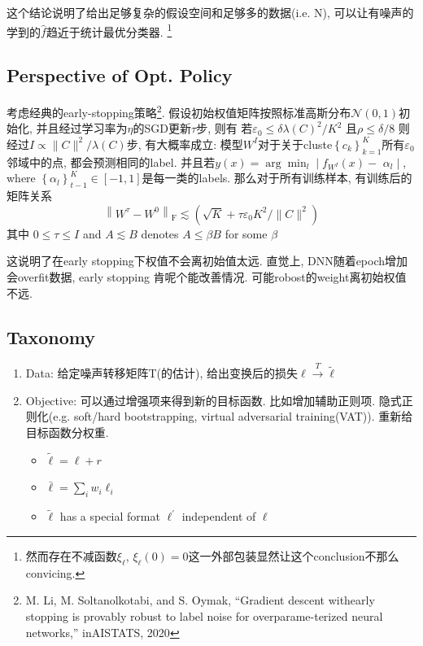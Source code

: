 \documentclass{article}
\begin{document}
\begin{remark}
    这个结论说明了给出足够复杂的假设空间和足够多的数据(i.e. N), 可以让有噪声的学到的$\hat f$趋近于统计最优分类器. \footnote{
        然而存在不减函数$\xi_{\ell}$, $\xi_{\ell}(0)=0$这一外部包装显然让这个conclusion不那么convicing.
    }
\end{remark}

\subsection{Perspective of Opt. Policy}

考虑经典的early-stopping策略\footnote{
    M. Li, M. Soltanolkotabi, and S. Oymak, “Gradient descent withearly stopping is provably robust to label noise for overparame-terized neural networks,” inAISTATS, 2020
}. 
假设初始权值矩阵按照标准高斯分布$\mathcal N(0, 1)$初始化, 并且经过学习率为$\eta$的SGD更新$\tau$步, 则有
若$\varepsilon_{0} \leq \delta \lambda(C)^{2} / K^{2}$
且$\rho \leq \delta / 8$
则经过$I \propto\|C\|^{2} / \lambda(C)$步,
有大概率成立:
模型$W^{I}$对于关于cluste$\left\{c_{k}\right\}_{k=1}^{K}$所有$\varepsilon_0$邻域中的点, 都会预测相同的label.
并且若$y(x)=\arg \min _{l} \mid f_{W^{I}}(x)-$
$\alpha_{l} \mid$, 
where $\left\{\alpha_{l}\right\}_{t-1}^{K} \in[-1,1]$是每一类的labels.
那么对于所有训练样本, 有训练后的矩阵关系
\begin{equation}
    \left\|W^{\tau}-W^{0}\right\|_{\mathrm{F}} \lesssim\left(\sqrt{K}+\tau \varepsilon_{0} K^{2} /\|C\|^{2}\right)
\end{equation}
其中
$0 \leq \tau \leq I$ and $A \lesssim B$ denotes $A \leq \beta B$ for some $\beta$

\begin{remark}
    这说明了在early stopping下权值不会离初始值太远. 直觉上, DNN随着epoch增加会overfit数据, early stopping 肯呢个能改善情况. 可能robost的weight离初始权值不远.
\end{remark}

\subsection{Taxonomy}

\begin{enumerate}
    \item Data: 给定噪声转移矩阵T(的估计), 给出变换后的损失$\ell \stackrel{T}{\rightarrow} \tilde{\ell}$
    \item Objective: 可以通过增强项来得到新的目标函数. 比如增加辅助正则项. 隐式正则化(e.g. soft/hard bootstrapping, virtual adversarial training(VAT)). 重新给目标函数分权重.\begin{itemize}
        \item $\tilde{\ell}=\ell+r$
        \item $\bar{\ell}=\sum_{i} w_{i} \ell_{i}$
        \item $\tilde \ell$ has a special format $\ell^{\prime}$ independent of $\ell$
    \end{itemize}
\end{enumerate}
\end{document}
